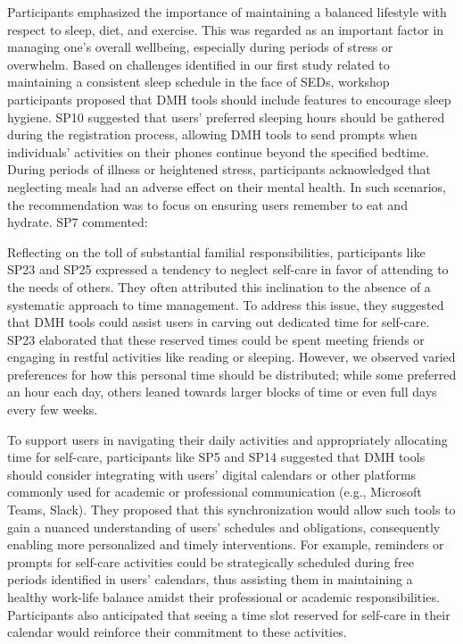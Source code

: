 Participants emphasized the importance of maintaining a balanced lifestyle with respect to sleep, diet, and exercise. This was regarded as an important factor in managing one's overall wellbeing, especially during periods of stress or overwhelm. Based on challenges identified in our first study related to maintaining a consistent sleep schedule in the face of SEDs, workshop participants proposed that DMH tools should include features to encourage sleep hygiene. SP10 suggested that users' preferred sleeping hours should be gathered during the registration process, allowing DMH tools to send prompts when individuals' activities on their phones continue beyond the specified bedtime.
During periods of illness or heightened stress, participants acknowledged that neglecting meals had an adverse effect on their mental health. In such scenarios, the recommendation was to focus on ensuring users remember to eat and hydrate. SP7 commented:


Reflecting on the toll of substantial familial responsibilities, participants like SP23 and SP25 expressed a tendency to neglect self-care in favor of attending to the needs of others. They often attributed this inclination to the absence of a systematic approach to time management. To address this issue, they suggested that DMH tools could assist users in carving out dedicated time for self-care. SP23 elaborated that these reserved times could be spent meeting friends or engaging in restful activities like reading or sleeping. However, we observed varied preferences for how this personal time should be distributed; while some preferred an hour each day, others leaned towards larger blocks of time or even full days every few weeks.


To support users in navigating their daily activities and appropriately allocating time for self-care, participants like SP5 and SP14 suggested that DMH tools should consider integrating with users' digital calendars or other platforms commonly used for academic or professional communication (e.g., Microsoft Teams, Slack). They proposed that this synchronization would allow such tools to gain a nuanced understanding of users' schedules and obligations, consequently enabling more personalized and timely interventions. For example, reminders or prompts for self-care activities could be strategically scheduled during free periods identified in users' calendars, thus assisting them in maintaining a healthy work-life balance amidst their professional or academic responsibilities. Participants also anticipated that seeing a time slot reserved for self-care in their calendar would reinforce their commitment to these activities.

